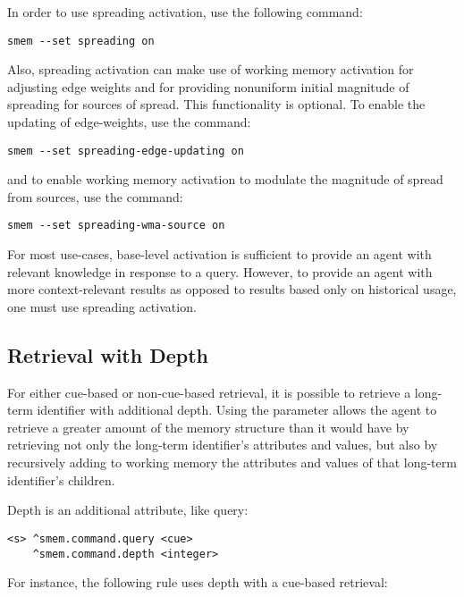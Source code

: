 In order to use spreading activation, use the following command:

\begin{verbatim}
smem --set spreading on
\end{verbatim}

Also, spreading activation can make use of working memory activation for adjusting edge weights and for providing nonuniform initial magnitude of spreading for sources of spread. This functionality is optional. To enable the updating of edge-weights, use the command:

\begin{verbatim}
smem --set spreading-edge-updating on
\end{verbatim}

and to enable working memory activation to modulate the magnitude of spread from sources, use the command:

\begin{verbatim}
smem --set spreading-wma-source on
\end{verbatim}

For most use-cases, base-level activation is sufficient to provide an agent with relevant knowledge in response to a query. However, to provide an agent with more context-relevant results as opposed to results based only on historical usage, one must use spreading activation.

\subsection{Retrieval with Depth}

For either cue-based or non-cue-based retrieval, it is possible to retrieve a long-term identifier with additional depth. Using the  parameter allows the agent to retrieve a greater amount of the memory structure than it would have by retrieving not only the long-term identifier's attributes and values, but also by recursively adding to working memory the attributes and values of that long-term identifier's children.

Depth is an additional  attribute, like query:

\begin{verbatim}
<s> ^smem.command.query <cue>
    ^smem.command.depth <integer>
\end{verbatim}

For instance, the following rule uses depth with a cue-based retrieval:

